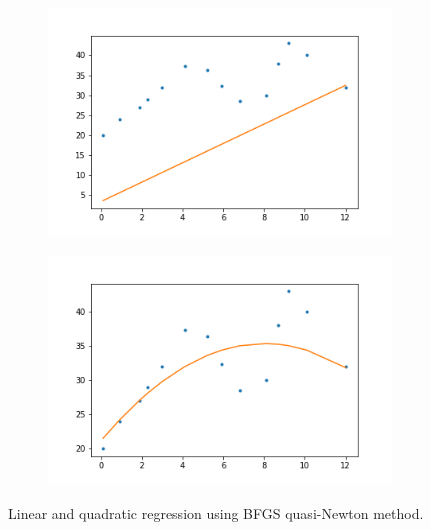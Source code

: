 \documentclass[11pt,margin=1in]{scrartcl}
\begin{document}
\begin{figure}
	\centering
	\begin{subfigure}{0.4\textwidth}
			\includegraphics[scale=0.5]{BFGSLinear}
	\end{subfigure}
	\begin{subfigure}{0.4\textwidth}
			\includegraphics[scale=0.5]{BFGSQuad}
	\end{subfigure}
	\caption{Linear and quadratic regression using BFGS quasi-Newton method.}
	\label{fig:p3b}
\end{figure}
\end{document}
